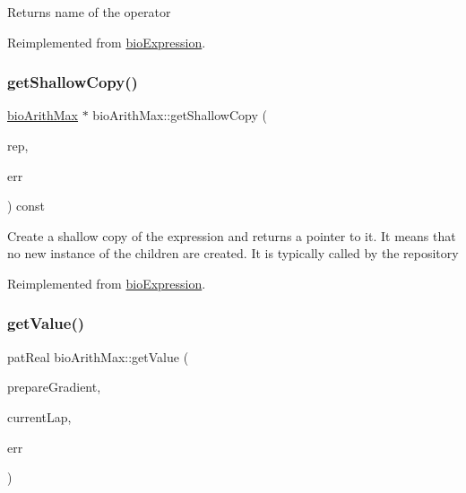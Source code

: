 \begin{DoxyReturn}{Returns}
name of the operator 
\end{DoxyReturn}


Reimplemented from \hyperlink{classbio_expression_a2353a4afb3a2b0af7c63aba086a72bde}{bio\+Expression}.

\mbox{\label{classbio_arith_max_a038037a69623c574752c0e5d56c39e9b}} 
\subsubsection{\texorpdfstring{get\+Shallow\+Copy()}{getShallowCopy()}}
{\footnotesize\ttfamily \hyperlink{classbio_arith_max}{bio\+Arith\+Max} $\ast$ bio\+Arith\+Max\+::get\+Shallow\+Copy (\begin{DoxyParamCaption}\item[{\hyperlink{classbio_expression_repository}{bio\+Expression\+Repository} $\ast$}]{rep,  }\item[{pat\+Error $\ast$\&}]{err }\end{DoxyParamCaption}) const\hspace{0.3cm}{\ttfamily [virtual]}}

Create a shallow copy of the expression and returns a pointer to it. It means that no new instance of the children are created. It is typically called by the repository 

Reimplemented from \hyperlink{classbio_expression_a442534762693b92baaf33928979a1bf8}{bio\+Expression}.

\mbox{\label{classbio_arith_max_a7d8d72eba4b603fadd764cac3cecf23a}} 
\subsubsection{\texorpdfstring{get\+Value()}{getValue()}}
{\footnotesize\ttfamily pat\+Real bio\+Arith\+Max\+::get\+Value (\begin{DoxyParamCaption}\item[{pat\+Boolean}]{prepare\+Gradient,  }\item[{pat\+U\+Long}]{current\+Lap,  }\item[{pat\+Error $\ast$\&}]{err }\end{DoxyParamCaption})\hspace{0.3cm}{\ttfamily [virtual]}}

